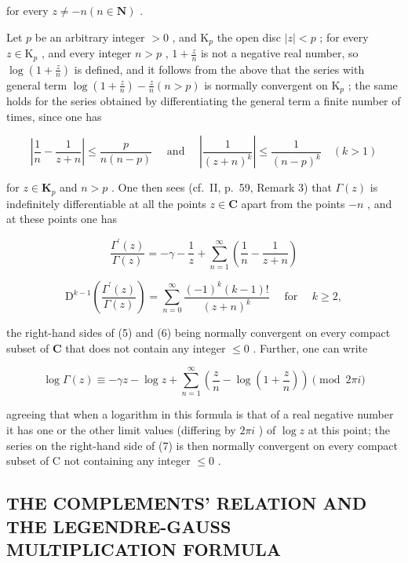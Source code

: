 for every \(z \neq -n (n \in \mathbf{N})\) .

Let \(p\) be an arbitrary integer \(> 0\) , and \(\mathrm{K}_p\) the open disc \(|z| < p\) ; for every \(z \in \mathrm{K}_p\) , and every integer \(n > p\) , \(1 + \frac{z}{n}\) is not a negative real number, so \(\log \left(1 + \frac{z}{n}\right)\) is defined, and it follows from the above that the series with general term \(\log \left(1 + \frac{z}{n}\right) - \frac{z}{n} (n > p)\) is normally convergent on \(\mathrm{K}_p\) ; the same holds for the series obtained by differentiating the general term a finite number of times, since one has

\[
\left| \frac {1}{n} - \frac {1}{z + n} \right| \leqslant \frac {p}{n (n - p)} \quad \text { and } \quad \left| \frac {1}{(z + n) ^ {k}} \right| \leqslant \frac {1}{(n - p) ^ {k}} \quad (k > 1)
\]

for \(z \in \mathbf{K}_p\) and \(n > p\) . One then sees (cf.~II, p.~59, Remark 3) that \(\Gamma(z)\) is indefinitely differentiable at all the points \(z \in \mathbf{C}\) apart from the points \(-n\) , and at these points one has

\[
{\frac {\Gamma^ {\prime} (z)}{\Gamma (z)}} = - \gamma - {\frac {1}{z}} + \sum_ {n = 1} ^ {\infty} \left({\frac {1}{n}} - {\frac {1}{z + n}}\right)\tag{5}
\]

\[
\mathrm{D} ^ {k - 1} \left(\frac {\Gamma^ {\prime} (z)}{\Gamma (z)}\right) = \sum_ {n = 0} ^ {\infty} \frac {(- 1) ^ {k} (k - 1) !}{(z + n) ^ {k}} \quad \text { for } \quad k \geqslant 2,\tag{6}
\]

the right-hand sides of (5) and (6) being normally convergent on every compact subset of \(\mathbf{C}\) that does not contain any integer \(\leqslant 0\) . Further, one can write

\[
\log \Gamma (z) \equiv - \gamma z - \log z + \sum_ {n = 1} ^ {\infty} \left(\frac {z}{n} - \log \left(1 + \frac {z}{n}\right)\right) \pmod {2 \pi i}\tag{7}
\]

agreeing that when a logarithm in this formula is that of a real negative number it has one or the other limit values (differing by \(2\pi i\) ) of \(\log z\) at this point; the series on the right-hand side of (7) is then normally convergent on every compact subset of C not containing any integer \(\leqslant 0\) .

\subsection{THE COMPLEMENTS' RELATION AND THE LEGENDRE-GAUSS MULTIPLICATION FORMULA}


